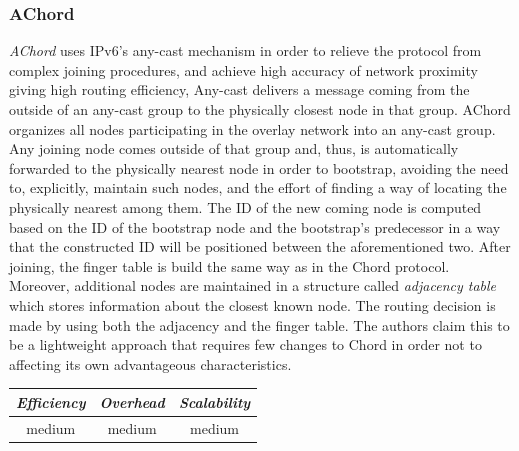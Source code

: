 \subsubsection{AChord}
\emph{AChord} \cite{DK2006} uses IPv6's any-cast mechanism in order to
relieve the protocol from complex joining procedures, and achieve high accuracy
of network proximity giving high routing efficiency, Any-cast delivers a message
coming from the outside of an any-cast group to the physically closest node in
that group. AChord organizes all nodes participating in the overlay network into
an any-cast group. Any joining node comes outside of that group and, thus, is
automatically forwarded to the physically nearest node in order to bootstrap,
avoiding the need to, explicitly, maintain such nodes, and the effort of finding
a way of locating the physically nearest among them. The ID of the new coming
node is computed based on the ID of the bootstrap node and the bootstrap's
predecessor in a way that the constructed ID will be positioned between the
aforementioned two. After joining, the finger table is build the same way as in
the Chord protocol. Moreover, additional nodes are maintained in a structure
called \emph{adjacency table} which stores information about the closest known
node. The routing decision is made by using both the adjacency and the finger
table. The authors claim this to be a lightweight approach that requires few
changes to Chord in order not to affecting its own advantageous characteristics.

\begin{center}
\begin{tabular}{ccc}
\emph{Efficiency} & \emph{Overhead} & \emph{Scalability} \\
\hline
medium &
medium &
medium
\end{tabular}
\end{center}

